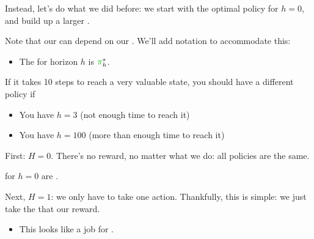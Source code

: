         Instead, let's do what we did before: we start with the optimal policy for $h=0$, and build up a larger .\\

        \begin{notation}
            Note that our  can depend on our . We'll add notation to accommodate this:

            \begin{itemize}
                \item The  for horizon $h$ is $\grn{\pi}_h^*$.
            \end{itemize}

            
        \end{notation}

        \miniex If it takes 10 steps to reach a very valuable state, you should have a different policy if 

        \begin{itemize}
            \item You have $h=3$ (not enough time to reach it)
            \item You have $h=100$ (more than enough time to reach it)
        \end{itemize}

        \subsecdiv

        First: $H=0$. There's no reward, no matter what we do: all policies are the same.\\

        \begin{concept}
             for $h=0$ are .
        \end{concept}

        \subsecdiv

        Next, $H=1$: we only have to take one action. Thankfully, this is simple: we just take the  that  our reward.

        \begin{itemize}
            \item This looks like a job for .
                \\
        \end{itemize}

